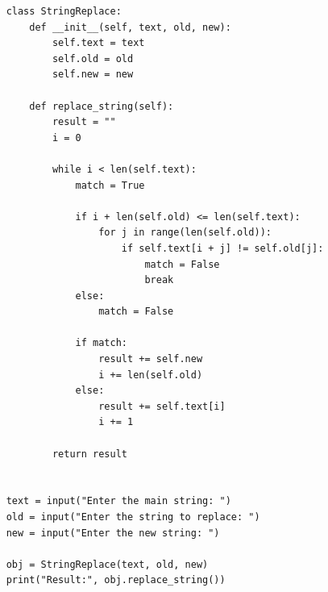 \begin{verbatim}
    class StringReplace:
        def __init__(self, text, old, new):
            self.text = text
            self.old = old
            self.new = new
    
        def replace_string(self):
            result = ""
            i = 0
    
            while i < len(self.text):
                match = True
    
                if i + len(self.old) <= len(self.text):
                    for j in range(len(self.old)):
                        if self.text[i + j] != self.old[j]:
                            match = False
                            break
                else:
                    match = False
    
                if match:
                    result += self.new
                    i += len(self.old)
                else:
                    result += self.text[i]
                    i += 1
    
            return result
    
    
    text = input("Enter the main string: ")
    old = input("Enter the string to replace: ")
    new = input("Enter the new string: ")
    
    obj = StringReplace(text, old, new)
    print("Result:", obj.replace_string())
\end{verbatim}